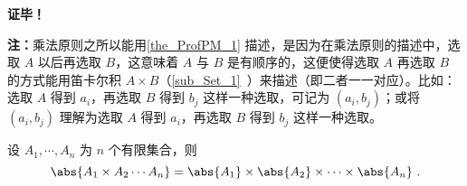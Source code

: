 \textbf{证毕！}

\textbf{注：}乘法原则之所以能用\autoref{the_ProfPM_1} 描述，是因为在乘法原则的描述中，选取 $A$ 以后再选取 $B$，这意味着 $A$ 与 $B$ 是有顺序的，这便使得选取 $A$ 再选取 $B$ 的方式能用笛卡尔积 $A\times B$（\autoref{sub_Set_1}~）来描述（即二者一一对应）。比如：选取 $A$ 得到 $a_i$，再选取 $B$ 得到 $b_j$ 这样一种选取，可记为 $(a_i,b_j)$；或将 $(a_i,b_j)$ 理解为选取 $A$ 得到 $a_i$，再选取 $B$ 得到 $b_j$ 这样一种选取。
\begin{corollary}{}
设 $A_1,\cdots,A_n$ 为 $n$ 个有限集合，则
\begin{equation}
\abs{A_1\times A_2\cdots A_n}=\abs{A_1}\times\abs{A_2}\times\cdots\times\abs{A_n}~.
\end{equation}

\end{corollary}